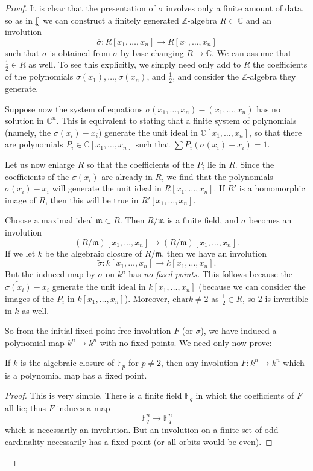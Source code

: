 \begin{proof} 
It is clear that the presentation of $\sigma$ involves only a finite amount of
data, so as in \cref{} we can construct a finitely generated
$\mathbb{Z}$-algebra $R \subset \mathbb{C}$ and an involution
\[ \overline{\sigma}: R[x_1, \dots, x_n] \to R[x_1, \dots, x_n] \] such that $\sigma$ is obtained from
$\overline{\sigma}$ by base-changing $R \to \mathbb{C}$.
We can assume that $\frac{1}{2} \in R$ as well.
To see this explicitly, we simply need only add to $R$ the coefficients of the
polynomials $\sigma(x_1), \dots, \sigma(x_n)$, and $\frac{1}{2}$, and
consider the $\mathbb{Z}$-algebra they generate.

Suppose now the system of equations $\sigma(x_1, \dots, x_n) - (x_1, \dots,
x_n)$ has no solution in $\mathbb{C}^n$. This is equivalent to stating that a
finite
system of polynomials (namely, the $\sigma(x_i) - x_i$) generate the unit ideal in $\mathbb{C}[x_1, \dots,
x_n]$, so that there are polynomials $P_i \in \mathbb{C}[x_1, \dots, x_n]$
such that $\sum P_i \left( \sigma(x_i) - x_i \right)  = 1$. 

Let us now enlarge $R$ so that the coefficients of the $P_i$ lie in $R$.
Since the coefficients of the $\sigma(x_i)$ are already in $R$, we find
that the polynomials $\sigma(x_i) - x_i$ will generate the unit ideal in
$R[x_1, \dots, x_n]$.
If $R'$ is a homomorphic image of $R$, then this will be true in $R'[x_1,
\dots, x_n]$.

Choose a maximal ideal $\mathfrak{m} \subset R$. Then $R/\mathfrak{m}$ is a
finite field, and $\sigma$ becomes an involution
\[ (R/\mathfrak{m})[x_1, \dots, x_n] \to (R/\mathfrak{m})[x_1, \dots, x_n].  \]
If we let $\overline{k}$ be the algebraic closure of $R/\mathfrak{m}$, then we
have an involution
\[ \widetilde{\sigma}: k[x_1, \dots, x_n] \to k[x_1, \dots, x_n].  \]
But the induced map by $\widetilde{\sigma}$ on $k^n$ has \emph{no fixed points.}  This follows because the
$\widetilde{\sigma(x_i)} - x_i$ generate the unit ideal in $k[x_1, \dots,
x_n]$ (because we can consider the images of the $P_i$ in $k[x_1, \dots, x_n]$).
Moreover, $\mathrm{char} k \neq 2$ as $\frac{1}{2} \in R$, so $2$ is
invertible in $k$ as well.

So from the initial fixed-point-free involution $F$ (or $\sigma$), we have
induced a 
polynomial map $k^n \to k^n$ with no fixed points. We need only now prove:

\begin{lemma} 
If $k$ is the algebraic closure of $\mathbb{F}_p$ for $p \neq 2$, then any
involution $F: k^n \to k^n$ which is a polynomial map has  a fixed point.
\end{lemma} 
\begin{proof} 
This is very simple. There is a finite field $\mathbb{F}_q$ in which the
coefficients of $F$ all lie; thus $F$ induces a map
\[ \mathbb{F}_q^n \to \mathbb{F}_q^n  \]
which is necessarily an involution. But an involution on a finite set of odd
cardinality necessarily has a fixed point (or all orbits would be even).
\end{proof} 

\end{proof} 
